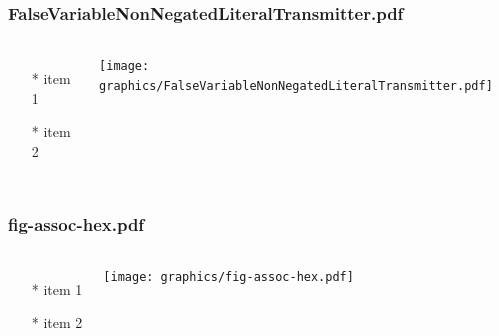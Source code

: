 \begin{frame} \frametitle{FalseVariableNonNegatedLiteralTransmitter.pdf}
    \begin{columns}[c]
        \begin{itemize}
            \item[*] item 1
            \item[*] item 2
        \end{itemize}
        \begin{minipage}{\linewidth}
            \begin{center}
            \texttt{[image: graphics/FalseVariableNonNegatedLiteralTransmitter.pdf]}
            \label{gfx:FalseVariableNonNegatedLiteralTransmitter.pdf}
            \end{center}
        \end{minipage}
    \end{columns}
\end{frame}
\begin{frame} \frametitle{fig-assoc-hex.pdf}
    \begin{columns}[c]
        \begin{itemize}
            \item[*] item 1
            \item[*] item 2
        \end{itemize}
        \begin{minipage}{\linewidth}
            \begin{center}
            \texttt{[image: graphics/fig-assoc-hex.pdf]}
            \label{gfx:fig-assoc-hex.pdf}
            \end{center}
        \end{minipage}
    \end{columns}
\end{frame}
